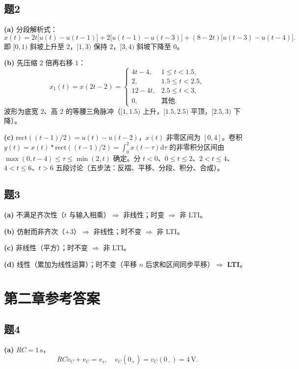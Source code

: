 \documentclass[11pt,a4paper]{ctexart}
\newcommand{\dd}{\mathrm{d}}
\newcommand{\rect}{\mathrm{rect}}
\begin{document}
\subsection*{题2}

\textbf{(a)} 分段解析式：
\[
x(t)=2t\bigl[u(t)-u(t-1)\bigr]+2\bigl[u(t-1)-u(t-3)\bigr]+(8-2t)\bigl[u(t-3)-u(t-4)\bigr].
\]
即 $[0,1)$ 斜坡上升至 $2$，$[1,3)$ 保持 $2$，$[3,4)$ 斜坡下降至 $0$。

\textbf{(b)} 先压缩 $2$ 倍再右移 $1$：
\[
x_1(t)=x(2t-2)=
\begin{cases}
4t-4, & 1\le t<1.5,\\
2,    & 1.5\le t<2.5,\\
12-4t,& 2.5\le t<3,\\
0,    & \text{其他}.
\end{cases}
\]
波形为底宽 $2$、高 $2$ 的等腰三角脉冲（$[1,1.5)$ 上升，$[1.5,2.5)$ 平顶，$[2.5,3)$ 下降）。

\textbf{(c)} $\rect((t-1)/2)=u(t)-u(t-2)$，$x(t)$ 非零区间为 $[0,4]$。卷积 $y(t)=x(t)*\rect((t-1)/2)=\int_{0}^{2}x(t-\tau)\dd\tau$ 的非零积分区间由 $\max(0,t-4)\le\tau\le\min(2,t)$ 确定。分 $t<0$、$0\le t\le 2$、$2<t\le 4$、$4<t\le 6$、$t>6$ 五段讨论（五步法：反褶、平移、分段、积分、合成）。

\subsection*{题3}

\textbf{(a)} 不满足齐次性（$t$ 与输入相乘）$\Rightarrow$ 非线性；时变 $\Rightarrow$ 非 LTI。

\textbf{(b)} 仿射而非齐次（$+3$）$\Rightarrow$ 非线性；时不变 $\Rightarrow$ 非 LTI。

\textbf{(c)} 非线性（平方）；时不变 $\Rightarrow$ 非 LTI。

\textbf{(d)} 线性（累加为线性运算）；时不变（平移 $n$ 后求和区间同步平移）$\Rightarrow$ \textbf{LTI}。

\section{第二章参考答案}

\subsection*{题4}

\textbf{(a)} $RC=1\,\mathrm{s}$，
\[
RC\dot{v}_C+v_C=v_s,\quad v_C(0_+)=v_C(0_-)=4\,\mathrm{V}.
\]
\end{document}
